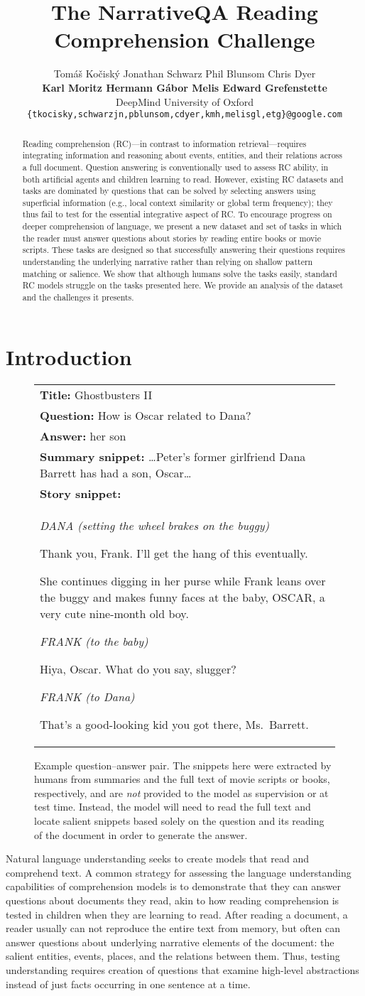 \documentclass[11pt,letterpaper]{article}
\title{The NarrativeQA Reading Comprehension Challenge}
\author{
Tom\'a\v s Ko\v cisk\'y \quad
Jonathan Schwarz \quad 
Phil Blunsom \quad 
Chris Dyer \\
{\bf Karl Moritz Hermann \quad 
G\'abor Melis \quad 
Edward Grefenstette} \\
DeepMind \quad
University of Oxford \\
{\tt \{tkocisky,schwarzjn,pblunsom,cdyer,kmh,melisgl,etg\}@google.com}
}
\date{}
\newcommand{\examplea}[7]{\begin{figure}[tb]
\begin{tabular}{p{0.92\columnwidth}}
\toprule
\noindent \textbf{Title:} #1\\
\textbf{Question:} #2\\
\textbf{Answer:} #3\\
\textbf{Summary snippet:} #4\\
\textbf{Story snippet:} #5 \\
\bottomrule
\end{tabular}
\caption{#6}
\label{#7}
\end{figure}}
\newcommand{\ghostexample}{\examplea{Ghostbusters II}
{\small How is Oscar related to Dana?}
{\small her son}
{\small\dots Peter's former girlfriend Dana Barrett has had a son, Oscar\dots}
{\\
\small \centerline{\textit{DANA (setting the wheel brakes on the buggy)}}
\small \centerline{Thank you, Frank.  I'll get the hang of this eventually.}

\vspace{0.2cm}
\small She continues digging in her purse while Frank leans over the buggy and makes funny faces at the baby, OSCAR, a very cute nine-month old boy.

\vspace{0.2cm}
\small\centerline{\textit{FRANK (to the baby)}}
\small\centerline{Hiya, Oscar.  What do you say, slugger?}

\vspace{0.2cm}
\small\centerline{\textit{FRANK (to Dana)}}
\small That's a good-looking kid you got there, Ms.\ Barrett.}
{Example question--answer pair. The snippets here were extracted by humans from summaries and the full text of movie scripts or books, respectively, and are \emph{not} provided to the model as supervision or at test time. Instead, the model will need to read the full text and locate salient snippets based solely on the question and its reading of the document in order to generate the answer.}
{fig:example1}}
\begin{document}
\maketitle
\begin{abstract}
Reading comprehension (RC)---in contrast to information retrieval---requires integrating information and reasoning about events, entities, and their relations across a full document. Question answering is conventionally used to assess RC ability, in both artificial agents and children learning to read. However,
existing RC datasets and tasks are dominated by questions that can be solved by selecting answers using superficial information (e.g., local context similarity or global term frequency); they thus fail to test for the essential integrative aspect of RC. To encourage progress on deeper comprehension of language, we present a new dataset and set of tasks in which the reader must answer questions about stories by reading entire books or movie scripts. These tasks are designed so that successfully answering their questions requires understanding the underlying narrative rather than relying on shallow pattern matching or salience. We show that although humans solve the tasks easily, standard RC models struggle on the tasks presented here. We provide an analysis of the dataset and the challenges it presents.
\end{abstract}

\section{Introduction}

\ghostexample

Natural language understanding seeks to create models that read and comprehend text. A common strategy for assessing the language understanding capabilities of comprehension models is to demonstrate that they can answer questions about documents they read, akin to how reading comprehension is tested in children when they are learning to read.
After reading a document, a reader usually can not reproduce the entire text from memory, but often can answer questions about underlying narrative elements of the document: the salient entities, events, places, and the relations between them.
Thus, testing understanding requires creation of questions that examine high-level abstractions instead of just facts occurring in one sentence at a time.
\end{document}

